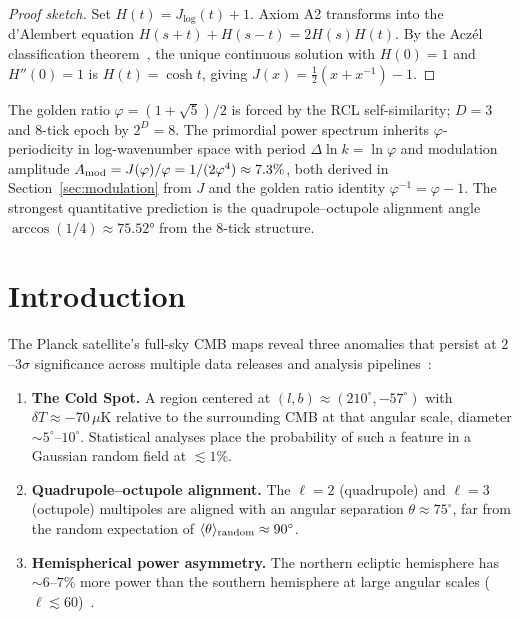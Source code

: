 \documentclass[12pt,a4paper]{article}
\theoremstyle{definition}
\theoremstyle{remark}
\begin{document}
\begin{proof}[Proof sketch]
Set $H(t) = J_{\log}(t)+1$.  Axiom A2 transforms into the d'Alembert
equation $H(s+t)+H(s-t)=2H(s)H(t)$.  By the Acz\'el classification
theorem~\cite{Aczel1966}, the unique continuous solution with $H(0)=1$
and $H''(0)=1$ is $H(t)=\cosh t$, giving
$J(x)=\tfrac{1}{2}(x+x^{-1})-1$.
\end{proof}

\noindent The golden ratio $\varphi=(1+\sqrt{5})/2$ is forced by the RCL
self-similarity; $D=3$ and 8-tick epoch by $2^D=8$.  The primordial power
spectrum inherits $\varphi$-periodicity in log-wavenumber space with period
$\Delta\ln k = \ln\varphi$ and modulation amplitude $A_{\rm mod} =
J(\varphi)/\varphi = 1/(2\varphi^4) \approx 7.3\%$, both derived in
Section~\ref{sec:modulation} from $J$ and the golden ratio identity
$\varphi^{-1} = \varphi - 1$.  The strongest quantitative prediction
is the quadrupole--octupole alignment angle $\arccos(1/4) \approx 75.52°$
from the 8-tick structure.

\section{Introduction}
\label{sec:intro}

The Planck satellite's full-sky CMB maps reveal three anomalies that
persist at $2$--$3\sigma$ significance across multiple data releases
and analysis pipelines~\cite{Planck2020VII}:

\begin{enumerate}[nosep]
  \item \textbf{The Cold Spot.}  A region centered at $(l, b) \approx
  (210^\circ, -57^\circ)$ with $\delta T \approx -70\,\mu$K relative
  to the surrounding CMB at that angular scale, diameter
  $\sim 5^\circ$--$10^\circ$.  Statistical analyses place the
  probability of such a feature in a Gaussian random field at
  $\lesssim 1\%$.

  \item \textbf{Quadrupole--octupole alignment.}  The $\ell = 2$
  (quadrupole) and $\ell = 3$ (octupole) multipoles are aligned with
  an angular separation $\theta \approx 75^\circ$, far from the random
  expectation of $\langle\theta\rangle_{\rm random} \approx 90^\circ$.

  \item \textbf{Hemispherical power asymmetry.}  The northern ecliptic
  hemisphere has $\sim 6$--$7\%$ more power than the southern hemisphere
  at large angular scales ($\ell \lesssim 60$)~\cite{Planck2020VII}.
\end{enumerate}
\end{document}
